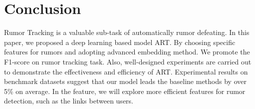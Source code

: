 \section{Conclusion}
\label{sec:conclusion}
Rumor Tracking is a valuable sub-task of automatically rumor defeating. In this paper, we proposed a deep learning based model ART.  By choosing specific features for rumors and adopting advanced embedding method. We promote the F1-score on rumor tracking task. Also, well-designed experiments are carried out to demonstrate the effectiveness and efficiency of ART. Experimental results on benchmark datasets suggest that our model leads the baseline methods by over 5\% on average. In the feature, we will explore more efficient features for rumor detection, such as the links between users. 